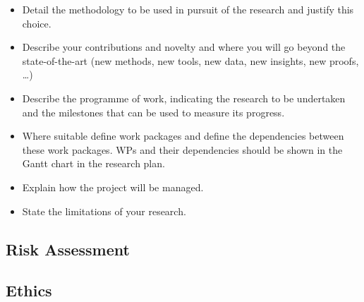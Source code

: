 \begin{itemize}
    \item Detail the methodology to be used in pursuit of the research and justify this choice.
    \item Describe your contributions and novelty and where you
    will go beyond the state-of-the-art (new methods, new tools,
    new data, new insights, new proofs, \ldots)
    \item Describe the programme of work, indicating the research to be undertaken and the milestones that can be used to measure its progress.
    \item Where suitable define work packages and define the dependencies
    between these work packages.
    WPs and their dependencies should be
    shown in the Gantt chart in the research plan.
    \item Explain how the project will be managed.
    \item State the limitations of your research.
\end{itemize}

\subsection{Risk Assessment}\label{subsec:risk-assessment}

\subsection{Ethics}\label{subsec:ethics}
